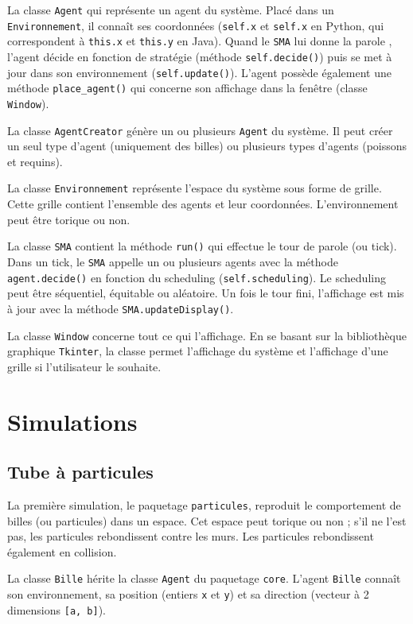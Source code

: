 \documentclass[a4paper]{article}
\begin{document}
\medskip
La classe \texttt{Agent} qui représente un agent du système. Placé dans un \texttt{Environnement}, il connaît ses coordonnées (\texttt{self.x} et \texttt{self.x} en Python, qui correspondent à \texttt{this.x} et \texttt{this.y} en Java). Quand le \texttt{SMA} lui \og donne la parole \fg{}, l'agent décide en fonction de stratégie (méthode \texttt{self.decide()}) puis se met à jour dans son environnement (\texttt{self.update()}). L'agent possède également une méthode \texttt{place\_agent()} qui concerne son affichage dans la fenêtre (classe \texttt{Window}).

\medskip
La classe \texttt{AgentCreator} génère un ou plusieurs \texttt{Agent} du système. Il peut créer un seul type d'agent (uniquement des billes) ou plusieurs types d'agents (poissons et requins).

\medskip
La classe \texttt{Environnement} représente l'espace du système sous forme de grille. Cette grille contient l'ensemble des agents et leur coordonnées. L'environnement peut être torique ou non. 

\medskip
La classe \texttt{SMA} contient la méthode \texttt{run()} qui effectue le tour de parole (ou tick). Dans un tick, le \texttt{SMA} appelle un ou plusieurs agents avec la méthode \texttt{agent.decide()} en fonction du scheduling (\texttt{self.scheduling}). Le scheduling peut être séquentiel, équitable ou aléatoire. Un fois le tour fini, l'affichage est mis à jour avec la méthode \texttt{SMA.updateDisplay()}.

\medskip
La classe \texttt{Window} concerne tout ce qui l'affichage. En se basant sur la bibliothèque graphique \texttt{Tkinter}, la classe permet l'affichage du système et l'affichage d'une grille si l'utilisateur le souhaite.

\section{Simulations}

\subsection{Tube à particules}

La première simulation, le paquetage \texttt{particules}, reproduit le comportement de billes (ou particules) dans un espace. Cet espace peut torique ou non ; s'il ne l'est pas, les particules rebondissent contre les murs. Les particules rebondissent également en collision.

\medskip
La classe \texttt{Bille} hérite la classe \texttt{Agent} du paquetage \texttt{core}. L'agent \texttt{Bille} connaît son environnement, sa position (entiers \texttt{x} et \texttt{y}) et sa direction (vecteur à 2 dimensions \texttt{[a, b]}).
\end{document}

